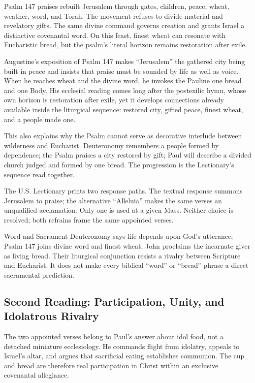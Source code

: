 Psalm 147 praises rebuilt Jerusalem through gates, children, peace, wheat, weather, word, and Torah. The movement refuses to divide material and revelatory gifts. The same divine command governs creation and grants Israel a distinctive covenantal word. On this feast, finest wheat can resonate with Eucharistic bread, but the psalm's literal horizon remains restoration after exile.

Augustine's exposition of Psalm 147 makes “Jerusalem” the gathered city being built in peace and insists that praise must be sounded by life as well as voice. When he reaches wheat and the divine word, he invokes the Pauline one bread and one Body. His ecclesial reading comes long after the postexilic hymn, whose own horizon is restoration after exile, yet it develops connections already available inside the liturgical sequence: restored city, gifted peace, finest wheat, and a people made one.

This also explains why the Psalm cannot serve as decorative interlude between wilderness and Eucharist. Deuteronomy remembers a people formed by dependence; the Psalm praises a city restored by gift; Paul will describe a divided church judged and formed by one bread. The progression is the Lectionary's sequence read together.

The U.S. Lectionary prints two response paths. The textual response summons Jerusalem to praise; the alternative “Alleluia” makes the same verses an unqualified acclamation. Only one is used at a given Mass. Neither choice is resolved; both refrains frame the same appointed verses.

\begin{studybox}{Word and Sacrament}
Deuteronomy says life depends upon God's utterance; Psalm 147 joins divine word and finest wheat; John proclaims the incarnate giver as living bread. Their liturgical conjunction resists a rivalry between Scripture and Eucharist. It does not make every biblical “word” or “bread” phrase a direct sacramental prediction.
\end{studybox}

\subsection*{Second Reading: Participation, Unity, and Idolatrous Rivalry\enspace{}}

The two appointed verses belong to Paul's answer about idol food, not a detached miniature ecclesiology. He commands flight from idolatry, appeals to Israel's altar, and argues that sacrificial eating establishes communion. The cup and bread are therefore real participation in Christ within an exclusive covenantal allegiance.

